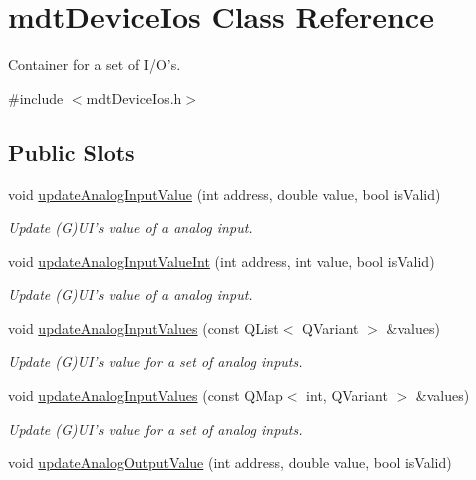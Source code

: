 \hypertarget{classmdt_device_ios}{
\section{mdtDeviceIos Class Reference}
\label{classmdt_device_ios}
}


Container for a set of I/O's.  




{\ttfamily \#include $<$mdtDeviceIos.h$>$}

\subsection*{Public Slots}
\begin{DoxyCompactItemize}
\item 
void \hyperlink{classmdt_device_ios_a1ddb8113380483dc88e4472875cd879d}{updateAnalogInputValue} (int address, double value, bool isValid)
\begin{DoxyCompactList}\small\item\em Update (G)UI's value of a analog input. \end{DoxyCompactList}\item 
void \hyperlink{classmdt_device_ios_a91c883cd29bfee659d536362b3553a9f}{updateAnalogInputValueInt} (int address, int value, bool isValid)
\begin{DoxyCompactList}\small\item\em Update (G)UI's value of a analog input. \end{DoxyCompactList}\item 
void \hyperlink{classmdt_device_ios_a82850ee99957ec5a787de71299ad785b}{updateAnalogInputValues} (const QList$<$ QVariant $>$ \&values)
\begin{DoxyCompactList}\small\item\em Update (G)UI's value for a set of analog inputs. \end{DoxyCompactList}\item 
void \hyperlink{classmdt_device_ios_a33fcf4b3c8f03b25988b1d2df9a56669}{updateAnalogInputValues} (const QMap$<$ int, QVariant $>$ \&values)
\begin{DoxyCompactList}\small\item\em Update (G)UI's value for a set of analog inputs. \end{DoxyCompactList}\item 
void \hyperlink{classmdt_device_ios_aaa6fbf435ddf8760487d962e1a6307f2}{updateAnalogOutputValue} (int address, double value, bool isValid)

\end{DoxyCompactItemize}
